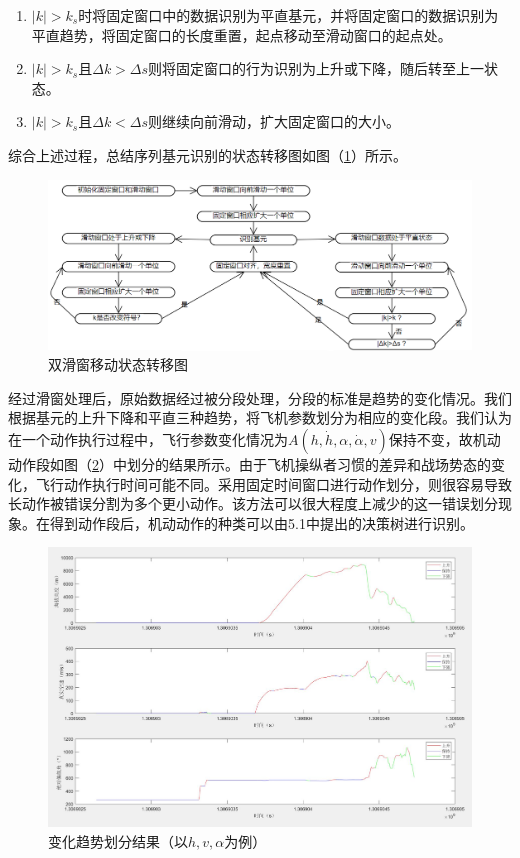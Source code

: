 \documentclass{my_paper}
\begin{document}
\begin{enumerate}
    \item $|k|>k_s$时将固定窗口中的数据识别为平直基元，并将固定窗口的数据识别为平直趋势，将固定窗口的长度重置，起点移动至滑动窗口的起点处。
    \item $|k|>k_s$且$\Delta k > \Delta s$则将固定窗口的行为识别为上升或下降，随后转至上一状态。
    \item $|k|>k_s$且$\Delta k < \Delta s$则继续向前滑动，扩大固定窗口的大小。
\end{enumerate}

综合上述过程，总结序列基元识别的状态转移图如图（\ref{slide}）所示。

\begin {figure}[h]
\centering %
\includegraphics[width=\textwidth]{slide.png}
\caption{双滑窗移动状态转移图} %
\label{slide}
\end {figure}

经过滑窗处理后，原始数据经过被分段处理，分段的标准是趋势的变化情况。我们根据基元的上升下降和平直三种趋势，将飞机参数划分为相应的变化段。我们认为在一个动作执行过程中，飞行参数变化情况为$A(h,\dot{h},\alpha,\dot{\alpha},v )$保持不变，故机动动作段如图（\ref{huafen}）中划分的结果所示。由于飞机操纵者习惯的差异和战场势态的变化，飞行动作执行时间可能不同。采用固定时间窗口进行动作划分，则很容易导致长动作被错误分割为多个更小动作。该方法可以很大程度上减少的这一错误划分现象。在得到动作段后，机动动作的种类可以由5.1中提出的决策树进行识别。

\begin {figure}[h]
\centering %
\includegraphics[width=\textwidth]{d.jpg}
\caption{变化趋势划分结果（以$h,v,\alpha$为例）} %
\label{huafen}
\end {figure}
\end{document}
